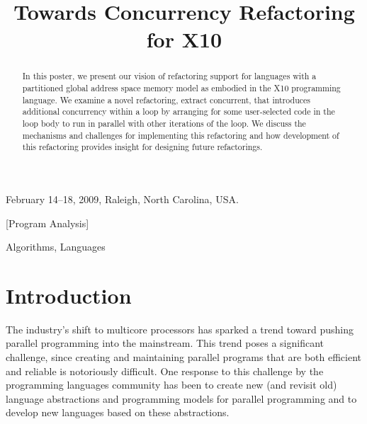\documentclass[natbib]{sigplanconf}
\begin{document}
\setlength{\pdfpageheight}{\paperheight}
\setlength{\pdfpagewidth}{\paperwidth}

\authorpermission
{} {February 14--18, 2009, Raleigh, North Carolina, USA.}
\title{Towards Concurrency Refactoring for X10}


\maketitle

\begin{abstract}
In this poster, we present our vision of refactoring 
support for languages with a partitioned global address space memory model as 
embodied in the X10 programming language. We examine a novel refactoring, 
extract concurrent, that introduces additional concurrency within a loop by
arranging for some user-selected code in the loop body to run in parallel
with other iterations of the loop. We discuss the mechanisms and challenges 
for implementing this refactoring and how development of this refactoring 
provides insight for designing future refactorings.
\end{abstract}

[Program Analysis]

\terms
Algorithms, Languages


\section{Introduction}

The industry's shift to multicore processors has sparked a trend
toward pushing parallel programming into the mainstream.  This trend
poses a significant challenge, since creating and maintaining parallel
programs that are both efficient and reliable is notoriously
difficult.  One response to this challenge
by the programming languages community has been to create new (and
revisit old) language
abstractions and programming models 
for parallel programming and to
develop new languages based on these abstractions.
\end{document}
